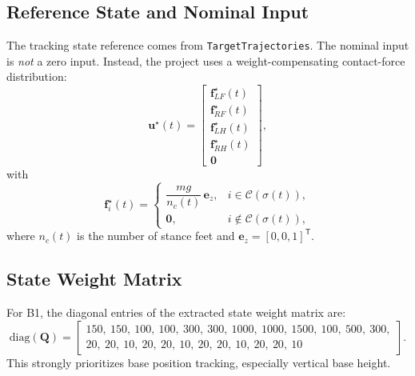 \documentclass[11pt,a4paper]{article}
\newcommand{\vect}[1]{\bm{#1}}
\newcommand{\mat}[1]{\bm{#1}}
\newcommand{\trans}{^{\mathsf T}}
\newcommand{\code}[1]{\texttt{#1}}
\begin{document}
\subsection{Reference State and Nominal Input}
The tracking state reference comes from \code{TargetTrajectories}. The nominal input is \emph{not} a zero input. Instead, the project uses a weight-compensating contact-force distribution:
\begin{equation}
\vect{u}^{\star}(t) =
\begin{bmatrix}
\vect{f}^{\star}_{LF}(t) \\
\vect{f}^{\star}_{RF}(t) \\
\vect{f}^{\star}_{LH}(t) \\
\vect{f}^{\star}_{RH}(t) \\
\vect{0}
\end{bmatrix},
\end{equation}
with
\begin{equation}
\vect{f}^{\star}_{i}(t)=
\begin{cases}
\dfrac{m g}{n_c(t)} \, \vect{e}_z, & i \in \mathcal{C}(\sigma(t)), \\[2mm]
\vect{0}, & i \notin \mathcal{C}(\sigma(t)),
\end{cases}
\end{equation}
where $n_c(t)$ is the number of stance feet and $\vect{e}_z = [0,0,1]\trans$.

\subsection{State Weight Matrix}
For B1, the diagonal entries of the extracted state weight matrix are:
\begin{equation}
\mathrm{diag}(\mat{Q}) =
\begin{bmatrix}
150,\ 150,\ 100,\ 100,\ 300,\ 300,\ 1000,\ 1000,\ 1500,\ 100,\ 500,\ 300, \nonumber \\
20,\ 20,\ 10,\ 20,\ 20,\ 10,\ 20,\ 20,\ 10,\ 20,\ 20,\ 10
\end{bmatrix}.
\end{equation}
This strongly prioritizes base position tracking, especially vertical base height.
\end{document}
